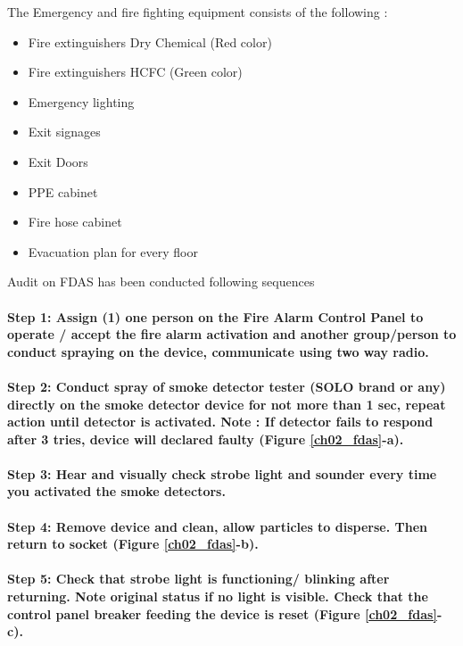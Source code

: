 The Emergency and fire fighting equipment consists of the following :
\begin{itemize}
\item Fire extinguishers Dry Chemical (Red color)
\item Fire extinguishers HCFC (Green color)
\item Emergency lighting 
\item Exit signages
\item Exit Doors
\item PPE cabinet
\item Fire hose cabinet
\item Evacuation plan for every floor
\end{itemize}

Audit on FDAS has been conducted following sequences

\paragraph{Step 1: Assign (1) one person on the Fire Alarm Control Panel  to operate / accept  the fire alarm activation and another group/person to conduct spraying on the device, communicate using two way radio.}

\paragraph{Step 2: Conduct spray of smoke detector tester (SOLO brand or any) directly on the smoke detector device for not more than 1 sec, repeat action until detector is activated. Note : If detector fails to respond after 3 tries,  device will declared faulty (Figure \ref{ch02_fdas}-a).}

\paragraph{Step 3: Hear and visually check strobe light and sounder every time you activated the smoke detectors.}

\paragraph{Step 4: Remove device and clean, allow particles to disperse. Then return to socket (Figure \ref{ch02_fdas}-b).}

\paragraph{Step 5: Check that strobe light is functioning/ blinking after returning. Note original status if no light is visible. Check that the control panel breaker feeding the device is reset (Figure \ref{ch02_fdas}-c).}

